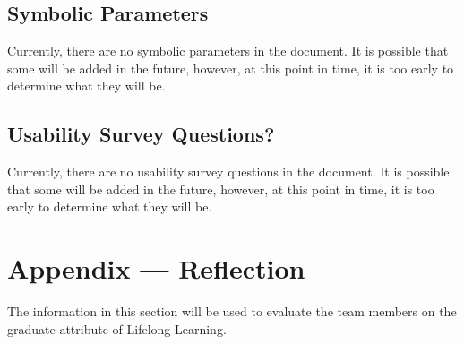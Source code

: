 \documentclass[12pt, titlepage]{article}
\begin{document}

\subsection{Symbolic Parameters}

Currently, there are no symbolic parameters in the document. It is possible that some will be added in the future, however, 
at this point in time, it is too early to determine what they will be.

\subsection{Usability Survey Questions?}

Currently, there are no usability survey questions in the document. It is possible that some will be added in the future, however,
at this point in time, it is too early to determine what they will be.

\newpage{}
\section*{Appendix --- Reflection}


The information in this section will be used to evaluate the team members on the
graduate attribute of Lifelong Learning.


\end{document}
